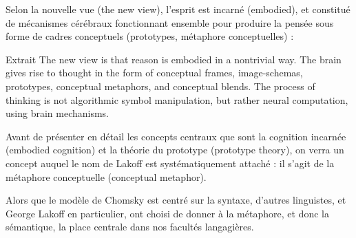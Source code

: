 
Selon la nouvelle vue (the new view), l'esprit est incarné (embodied), et constitué de mécanismes cérébraux fonctionnant ensemble pour produire la pensée sous forme de cadres conceptuels (prototypes, métaphore conceptuelles) : 
\begin{lecture}{Extrait}
The new view is that reason is embodied in a nontrivial way. The brain gives rise to thought in the form of conceptual frames, image-schemas, prototypes, conceptual metaphors, and conceptual blends. The process of thinking is not algorithmic symbol manipulation, but rather neural computation, using brain mechanisms.
\end{lecture}
 Avant de présenter en détail les concepts centraux que sont la cognition incarnée (embodied cognition) et la théorie du prototype (prototype theory), on verra un concept auquel le nom de Lakoff est systématiquement attaché : il s’agit de la métaphore conceptuelle (conceptual metaphor).\par

\par

Alors que le modèle de Chomsky est centré sur la syntaxe, d’autres linguistes, et George Lakoff en particulier, ont choisi de donner à la métaphore, et donc la sémantique, la place centrale dans nos facultés langagières.\par


